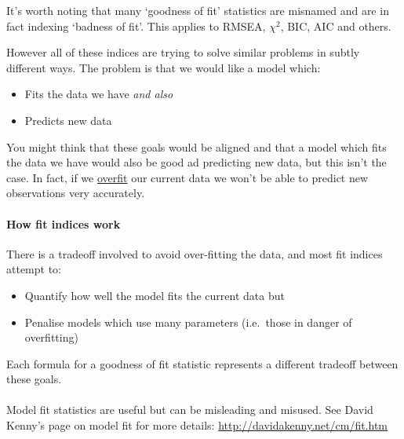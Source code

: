 \documentclass[]{article}
\providecommand{\tightlist}{%
  \setlength{\itemsep}{0pt}\setlength{\parskip}{0pt}}
\let\oldparagraph\paragraph
\renewcommand{\paragraph}[1]{\oldparagraph{#1}\mbox{}}
\begin{document}
It's worth noting that many `goodness of fit' statistics are misnamed and are in
fact indexing `badness of fit'. This applies to RMSEA, \(\chi^2\), BIC, AIC and
others.

However all of these indices are trying to solve similar problems in subtly
different ways. The problem is that we would like a model which:

\begin{itemize}
\tightlist
\item
  Fits the data we have \emph{and also}
\item
  Predicts new data
\end{itemize}

You might think that these goals would be aligned and that a model which fits
the data we have would also be good ad predicting new data, but this isn't the
case. In fact, if we \protect\hyperlink{over-fitting}{overfit} our current data we won't be able
to predict new observations very accurately.

\hypertarget{how-fit-indices-work}{%
\paragraph{How fit indices work}\label{how-fit-indices-work}}

There is a tradeoff involved to avoid over-fitting the data, and most fit
indices attempt to:

\begin{itemize}
\tightlist
\item
  Quantify how well the model fits the current data but
\item
  Penalise models which use many parameters (i.e.~those in danger of
  overfitting)
\end{itemize}

Each formula for a goodness of fit statistic represents a different tradeoff
between these goals.

\hypertarget{section-15}{%
\paragraph{}\label{section-15}}

Model fit statistics are useful but can be misleading and misused. See David
Kenny's page on model fit for more details: \url{http://davidakenny.net/cm/fit.htm}

\hypertarget{common-fit-indices}{%
\paragraph{}\label{common-fit-indices}}
\end{document}
